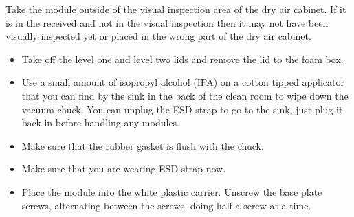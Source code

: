 \documentclass[12pt]{article}
\begin{document}
Take the module outside of the visual inspection area of the dry air cabinet. If it is in the received and not in the visual inspection then it may not have been visually inspected yet or placed in the wrong part of the dry air cabinet.  
\begin{itemize}
    \item Take off the level one and level two lids and remove the lid to the foam box. 
    \item Use a small amount of isopropyl alcohol (IPA) on a cotton tipped applicator that you can find by the sink in the back of the clean room to wipe down the vacuum chuck. You can unplug the ESD strap to go to the sink, just plug it back in before handling any modules.
    \item Make sure that the rubber gasket is flush with the chuck.
    \item Make sure that you are wearing ESD strap now.
    \item Place the module into the white plastic carrier. Unscrew the base plate screws, alternating between the screws, doing half a screw at a time. 
    

\end{itemize}
\end{document}

